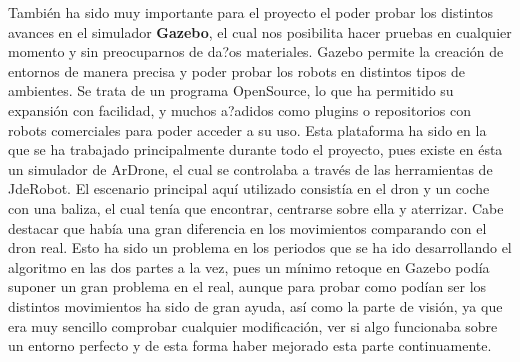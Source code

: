 \documentclass{report}
\begin{document}
\hspace{1 cm} Tambi\'en ha sido muy importante para el proyecto el poder probar los distintos avances en el simulador \textbf{Gazebo}, el cual nos posibilita hacer pruebas en cualquier momento y sin preocuparnos de da?os materiales. Gazebo permite la creaci\'on de entornos de manera precisa y poder probar los robots en distintos tipos de ambientes. Se trata de un programa OpenSource, lo que ha permitido su expansi\'on con facilidad, y muchos a?adidos como plugins o repositorios con robots comerciales para poder acceder a su uso. Esta plataforma ha sido en la que se ha trabajado principalmente durante todo el proyecto, pues existe en \'esta un simulador de ArDrone, el cual se controlaba a trav\'es de las herramientas de JdeRobot. El escenario principal aqu\'i utilizado consist\'ia en el dron y un coche con una baliza, el cual ten\'ia que encontrar, centrarse sobre ella y aterrizar. Cabe destacar que hab\'ia una gran diferencia en los movimientos comparando con el dron real. Esto ha sido un problema en los periodos que se ha ido desarrollando el algoritmo en las dos partes a la vez, pues un m\'inimo retoque en Gazebo pod\'ia suponer un gran problema en el real, aunque para probar como pod\'ian ser los distintos movimientos ha sido de gran ayuda, as\'i como la parte de visi\'on, ya que era muy sencillo comprobar cualquier modificaci\'on, ver si algo funcionaba sobre un entorno perfecto y de esta forma haber mejorado esta parte continuamente.
\end{document}
